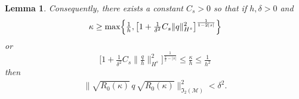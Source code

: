 \documentclass[10pt,a4paper]{amsart}
\newtheorem{lemma}{Lemma}
\begin{document}
\begin{lemma}
Consequently, there exists a constant \(C_s>0\) so that if \(h,\delta>0\) and
\begin{equation}\label{k bigger}
\kappa \geq \max\Bigl\{\tfrac1h,\bigl[ 1 + \tfrac1{\delta^2} C_s \| q\|_{H^s}^2 \bigr]^{\frac{1}{1-2|s|}}\Bigr\}
\end{equation}
or
\begin{equation}\label{shallow k bigger}
\bigl[ 1 + \tfrac1{\delta^2} C_s\bigl\|\tfrac qh\bigr\|_{H^s}^2 \bigr]^{\frac{1}{\frac32-|s|}}\leq \tfrac\kappa h\leq \tfrac1{h^2}
\end{equation}
then
\begin{align}\label{small norm}
 \| \sqrt{R_0(\kappa)}\, q\, \sqrt{R_0(\kappa)}\|_{\mathfrak I_2(\mathcal M)}^2 <\delta^2.
\end{align}
\end{lemma}
\end{document}

